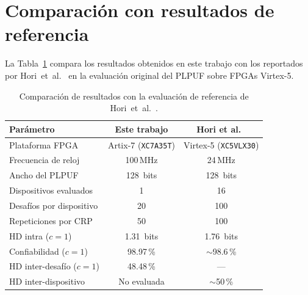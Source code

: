 \section{Comparación con resultados de referencia}
\label{sec:res_comparacion}

La Tabla~\ref{tab:comparacion} compara los resultados obtenidos en este
trabajo con los reportados por Hori~et~al.~\cite{hori_2011_pseudolfsr} en
la evaluación original del PLPUF sobre FPGAs Virtex-5.

\begin{table}[htbp]
\centering
\caption{Comparación de resultados con la evaluación de referencia de
  Hori~et~al.~\cite{hori_2011_pseudolfsr}.}
\label{tab:comparacion}
\small
\renewcommand{\arraystretch}{1.3}
\begin{tabular}{lcc}
\hline
\textbf{Parámetro} &
\textbf{Este trabajo} &
\textbf{Hori et al.~\cite{hori_2011_pseudolfsr}} \\
\hline
Plataforma FPGA       & Artix-7 (\texttt{XC7A35T}) & Virtex-5 (\texttt{XC5VLX30}) \\
Frecuencia de reloj   & 100\,MHz           & 24\,MHz \\
Ancho del PLPUF       & 128~bits           & 128~bits \\
Dispositivos evaluados & 1                 & 16 \\
Desafíos por dispositivo & 20              & 100 \\
Repeticiones por CRP  & 50                 & 100 \\
HD intra ($c=1$)      & 1.31~bits          & 1.76~bits \\
Confiabilidad ($c=1$) & 98.97\,\%          & $\sim$98.6\,\% \\
HD inter-desafío ($c=1$) & 48.48\,\%       & --- \\
HD inter-dispositivo  & No evaluada        & $\sim$50\,\% \\
\hline
\end{tabular}
\end{table}

